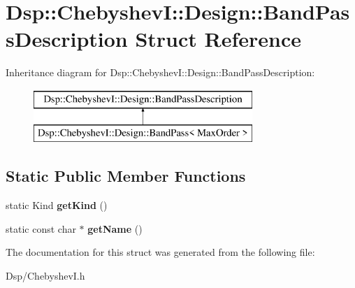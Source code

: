 \hypertarget{structDsp_1_1ChebyshevI_1_1Design_1_1BandPassDescription}{\section{Dsp\-:\-:Chebyshev\-I\-:\-:Design\-:\-:Band\-Pass\-Description Struct Reference}
\label{structDsp_1_1ChebyshevI_1_1Design_1_1BandPassDescription}
}
Inheritance diagram for Dsp\-:\-:Chebyshev\-I\-:\-:Design\-:\-:Band\-Pass\-Description\-:\begin{figure}[H]
\begin{center}
\leavevmode
\includegraphics[height=2.000000cm]{structDsp_1_1ChebyshevI_1_1Design_1_1BandPassDescription}
\end{center}
\end{figure}
\subsection*{Static Public Member Functions}
\begin{DoxyCompactItemize}
\item 
\hypertarget{structDsp_1_1ChebyshevI_1_1Design_1_1BandPassDescription_a10904849e27227d01c7877799db0a23d}{static Kind {\bfseries get\-Kind} ()}\label{structDsp_1_1ChebyshevI_1_1Design_1_1BandPassDescription_a10904849e27227d01c7877799db0a23d}

\item 
\hypertarget{structDsp_1_1ChebyshevI_1_1Design_1_1BandPassDescription_adbb218d98f17476eecc08194586989f0}{static const char $\ast$ {\bfseries get\-Name} ()}\label{structDsp_1_1ChebyshevI_1_1Design_1_1BandPassDescription_adbb218d98f17476eecc08194586989f0}

\end{DoxyCompactItemize}


The documentation for this struct was generated from the following file\-:\begin{DoxyCompactItemize}
\item 
Dsp/Chebyshev\-I.\-h\end{DoxyCompactItemize}
